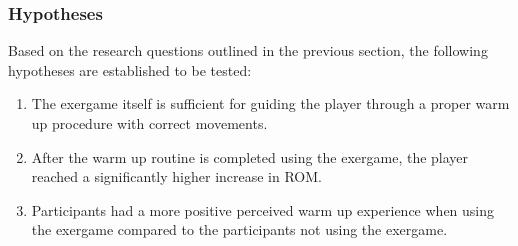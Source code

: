 \subsubsection{Hypotheses}
Based on the research questions outlined in the previous section, the following hypotheses are established to be tested: 
\begin{enumerate}
\item The exergame itself is sufficient for guiding the player through a proper warm up procedure with correct movements. 
\item After the warm up routine is completed using the exergame, the player reached a significantly higher increase in ROM.
\item Participants had a more positive perceived warm up experience when using the exergame compared to the participants not using the exergame.  
\end{enumerate}
\pagebreak
